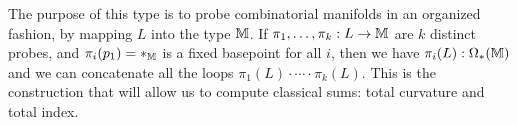 The purpose of this type is to probe combinatorial manifolds in an organized fashion, by mapping \( L \) into the type \( \mathbb{M} \). If \( \pi_1,\ldots,\pi_k:L\to \mathbb{M} \) are \( k \) distinct probes, and \( \pi_i(p_1)=*_{\mathbb{M}} \) is a fixed basepoint for all \( i \), then we have \( \pi_i(L):\Omega_*(\mathbb{M}) \) and we can concatenate all the loops \( \pi_1(L)\cdot\cdots\cdot\pi_k(L) \). This is the construction that will allow us to compute classical sums: total curvature and total index.

\begin{comment}
\subsection{The torus}

We can define a combinatorial torus as a similar HIT. This time each vertex will have six neighbors. So all the links will be merely equal to \( C_6 \) which is a hexagonal version of \( C_4 \). See Figure~\ref{fig:torus}. 

To help parse this figure, imagine instead Figure~\ref{fig:flattorus}. We take this simple alternating-triangle pattern, then glue the left and right edges, then bend into Figure~\ref{fig:torus}. The fact that each column in Figure~\ref{fig:flattorus} has four dots corresponds to the torus in Figure~\ref{fig:torus} having a square in front, diamonds in the middle, and a square in back.

\begin{figure}[htbp]
\centering

\caption{Torus embedded in 3-dimensional space. If you see color in your rendering then black lines trace four square-shaped paths, red ones connect the front square to the middle diamonds, and blue ones connect the back path to the middle ones.}
\label{fig:torus}
\end{figure}

\begin{figure}[htbp]
\centering

\caption{An inspiration for the torus. Identify the sides and then the top, definitionally, to get the actual torus.}
\label{fig:flattorus}
\end{figure}

This somewhat arbitrary and unfamiliar model of a torus has the helpful property that it is a combinatorial manifold that is somewhat minimal while still being representable by a donut shape. But the donut-shaped version suggests a very different connection than the flat model! Starting with the flat model, we can easily see how to define \( T_1 \) by sliding a link rigidly along the page to the link of some adjacent vertex. Then we can see that transport around any loop is the identity and so \( T_2 \) is always the identity (together with the homotopy \( \refl_\id \) from the identity to itself). So if we imagine a way to visit every face like we did for the octahedron, starting and ending at some basepoint \( v \), we expect to see no net rotation at all of \( Tv \). Later we will call this ``total curvature 0.''


\end{comment}
